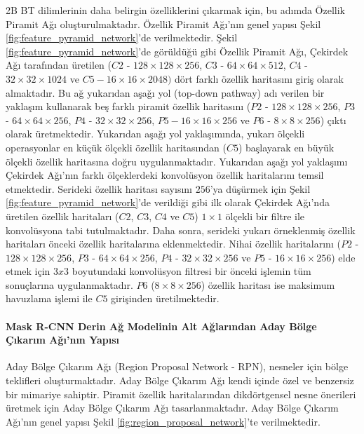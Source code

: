2B BT dilimlerinin daha belirgin özelliklerini çıkarmak için, bu adımda Özellik Piramit Ağı oluşturulmaktadır. Özellik Piramit Ağı'nın genel yapısı Şekil \ref{fig:feature_pyramid_network}’de verilmektedir. Şekil \ref{fig:feature_pyramid_network}’de görüldüğü gibi Özellik Piramit Ağı, Çekirdek Ağı tarafından üretilen ($C2$ - $128 \times 128 \times 256$, $C3$ - $64 \times 64 \times 512$, $C4$ - $32 \times 32 \times 1024$ ve $C5 - 16 \times 16 \times 2048)$ dört farklı özellik haritasını giriş olarak almaktadır. Bu ağ yukarıdan aşağı yol (top-down pathway) adı verilen bir yaklaşım kullanarak beş farklı piramit özellik haritasını ($P2$ - $128 \times 128 \times 256$, $P3$ - $64 \times 64 \times 256$, $P4$ - $32 \times 32 \times 256$, $P5 - 16 \times 16 \times 256$ ve $P6$ - $8 \times 8 \times 256$) çıktı olarak üretmektedir. Yukarıdan aşağı yol yaklaşımında, yukarı ölçekli operasyonlar en küçük ölçekli özellik haritasından ($C5$) başlayarak en büyük ölçekli özellik haritasına doğru uygulanmaktadır. Yukarıdan aşağı yol yaklaşımı Çekirdek Ağı'nın farklı ölçeklerdeki konvolüsyon özellik haritalarını temsil etmektedir. Serideki özellik haritası sayısını $256$’ya düşürmek için Şekil \ref{fig:feature_pyramid_network}’de verildiği gibi ilk olarak Çekirdek Ağı’nda üretilen özellik haritaları ($C2$, $C3$, $C4$ ve $C5$) $1 \times 1$ ölçekli bir filtre ile konvolüsyona tabi tutulmaktadır. Daha sonra, serideki yukarı örneklenmiş özellik haritaları önceki özellik haritalarına eklenmektedir. Nihai özellik haritalarını ($P2$ - $128 \times 128 \times 256$, $P3$ - $64 \times 64 \times 256$, $P4$ - $32 \times 32 \times 256$ ve $P5$ - $16 \times 16 \times 256$) elde etmek için $3 x 3$ boyutundaki konvolüsyon filtresi bir önceki işlemin tüm sonuçlarına  uygulanmaktadır. $P6$ ($8 \times 8 \times 256$) özellik haritası ise maksimum havuzlama işlemi ile $C5$ girişinden üretilmektedir.

\paragraph{Mask R-CNN Derin Ağ Modelinin Alt Ağlarından Aday Bölge Çıkarım Ağı'nın Yapısı}

Aday Bölge Çıkarım Ağı (Region Proposal Network - RPN), nesneler için bölge teklifleri oluşturmaktadır. Aday Bölge Çıkarım Ağı kendi içinde özel ve benzersiz bir mimariye sahiptir. Piramit özellik haritalarından dikdörtgensel nesne önerileri üretmek için Aday Bölge Çıkarım Ağı tasarlanmaktadır. Aday Bölge Çıkarım Ağı'nın genel yapısı Şekil \ref{fig:region_proposal_network}’te verilmektedir. 


